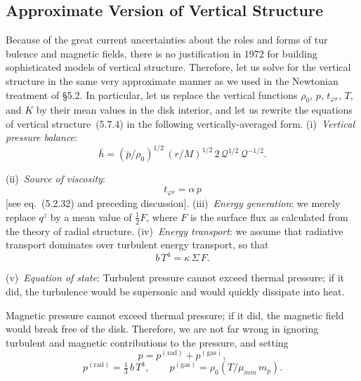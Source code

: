 
\subsection{Approximate Version of Vertical Structure}
\label{sec:5.8}

Because of the great current uncertainties about the roles and forms of tur%
bulence and magnetic fields, there is no justification in 1972 for building
sophisticated models of vertical structure.  Therefore, let us solve for the
vertical structure in the same very approximate manner as we used in the
Newtonian treatment of \S5.2.  In particular, let us replace the vertical functions
$\rho_0$, $p$, $t_{\varphi r}$, $T$, and $K$ by their mean values in the disk interior, and let us rewrite
the equations of vertical structure~(5.7.4) in the following vertically-averaged
form.  (i)~\textit{Vertical pressure balance}:
%
\begin{equation}
\tag{5.8.1a}
\bar{h}
= (\bar{p}/\rho_0)^{1/2}\, (r/M)^{1/2}\, 2\,\mathscr{Q}^{1/2}\,\mathscr{Q}^{-1/2}.
\end{equation}

(ii)~\textit{Source of viscosity}:
%
\begin{equation}
\tag{5.8.1b}
t_{\varphi r} = \alpha\, p
\end{equation}
%
[see eq.~(5.2.32) and preceding discussion].  (iii)~\textit{Energy generation}: we merely
replace $q^z$ by a mean value of $\frac{1}{2}F$, where $F$ is the surface flux as calculated from
the theory of radial structure.  (iv)~\textit{Energy transport}: we assume that radiative
transport dominates over turbulent energy transport, so that
%
\begin{equation}
\tag{5.8.1c}
b\,T^4 = \kappa\,\Sigma\, F.
\end{equation}

(v)~\textit{Equation of state}: Turbulent pressure cannot exceed thermal pressure; if it
did, the turbulence would be supersonic and would quickly dissipate into heat.


Magnetic pressure cannot exceed thermal pressure; if it did, the magnetic field
would break free of the disk.  Therefore, we are not far wrong in ignoring
turbulent and magnetic contributions to the pressure, and setting
%
\begin{equation}
\tag{5.8.1d}
p = p^{(\text{rad})} + p^{(\text{gas})},
\end{equation}
%
\begin{equation}
p^{(\text{rad})} = \tfrac{1}{3}\,b\,T^4, \qquad
p^{(\text{gas})} = \rho_0 (T/\mu_{mm}\, m_p).
\end{equation}

